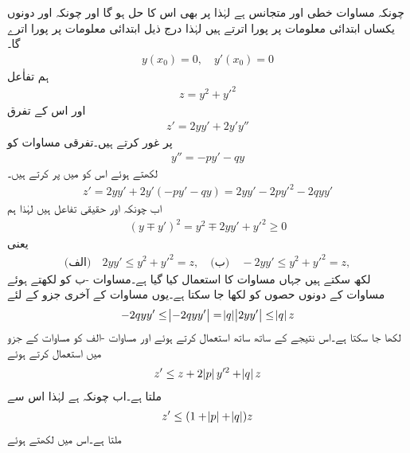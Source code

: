 چونکہ مساوات  خطی اور متجانس ہے  لہٰذا  پر  بھی اس کا حل ہو گا اور چونکہ  اور  دونوں یکساں ابتدائی معلومات پر پورا اترتے ہیں لہٰذا   درج ذیل ابتدائی معلومات پر پورا اترے گا۔
\begin{align}\label{مساوات_ضمیمہ_ضمنی_ابتدائی}
y(x_0)=0, \quad y'(x_0)=0
\end{align}
ہم تفاٰعل
\begin{align}\label{مساوات_ضمیمہ_ضمنی_تفاعل}
z=y^2+y'^2
\end{align}
اور اس کے تفرق
\begin{align}
z'=2yy'+2y'y''
\end{align}
پر غور کرتے ہیں۔تفرقی مساوات  کو
\begin{align*}
y''=-py'-qy
\end{align*}
لکھتے ہوئے اس کو  میں پر کرتے ہیں۔
\begin{align}\label{مساوات_ضمیمہ_ضمنی_تفاعل_ب}
z'=2yy'+2y'(-py'-qy)=2yy'-2py'^2-2qyy'
\end{align}
اب چونکہ  اور  حقیقی تفاعل ہیں لہٰذا ہم 
\begin{align}
(y \mp y')^2=y^2\mp 2yy'+y'^2 \ge 0
\end{align}
یعنی
\begin{align}\label{مساوات_ضمیمہ_ضمنی_حدود_الف}
\text{(الف)}\quad 2yy' \le y^2+y'^2=z, \quad \text{(ب)}\quad -2yy' \le y^2+y'^2=z,
\end{align}
لکھ سکتے ہیں جہاں مساوات  کا استعمال کیا گیا ہے۔مساوات -ب کو  لکھتے ہوئے مساوات  کے دونوں حصوں کو  لکھا جا سکتا ہے۔یوں مساوات  کے آخری جزو کے لئے
\begin{align*}
-2qyy'\le \abs{-2qyy'}=\abs{q}\abs{2yy'} \le \abs{q}z
\end{align*}
لکھا جا سکتا ہے۔اس نتیجے کے ساتھ ساتھ  استعمال کرتے ہوئے اور  مساوات -الف  کو  مساوات  کے  جزو میں استعمال کرتے ہوئے 
\begin{align*}
z' \le z+2\abs{p}y'^2+\abs{q}z
\end{align*}
ملتا ہے۔اب چونکہ  ہے لہٰذا اس سے
\begin{align*}
z' \le (1+\abs{p}+\abs{q})z
\end{align*}
ملتا ہے۔اس میں  لکھتے ہوئے
